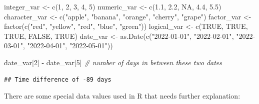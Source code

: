 \documentclass[
  12pt,
  oneside]{book}
\newenvironment{Shaded}{\begin{snugshade}}{\end{snugshade}}
\newcommand{\CommentTok}[1]{\textcolor[rgb]{0.56,0.35,0.01}{\textit{#1}}}
\newcommand{\ConstantTok}[1]{\textcolor[rgb]{0.00,0.00,0.00}{#1}}
\newcommand{\DecValTok}[1]{\textcolor[rgb]{0.00,0.00,0.81}{#1}}
\newcommand{\FloatTok}[1]{\textcolor[rgb]{0.00,0.00,0.81}{#1}}
\newcommand{\FunctionTok}[1]{\textcolor[rgb]{0.00,0.00,0.00}{#1}}
\newcommand{\NormalTok}[1]{#1}
\newcommand{\OtherTok}[1]{\textcolor[rgb]{0.56,0.35,0.01}{#1}}
\newcommand{\SpecialCharTok}[1]{\textcolor[rgb]{0.00,0.00,0.00}{#1}}
\newcommand{\StringTok}[1]{\textcolor[rgb]{0.31,0.60,0.02}{#1}}
\theoremstyle{definition}
\theoremstyle{definition}
\theoremstyle{definition}
\theoremstyle{definition}
\theoremstyle{remark}
\begin{document}
\begin{Shaded}
\begin{Highlighting}[]
\NormalTok{integer\_var }\OtherTok{\textless{}{-}} \FunctionTok{c}\NormalTok{(}\DecValTok{1}\NormalTok{, }\DecValTok{2}\NormalTok{, }\DecValTok{3}\NormalTok{, }\DecValTok{4}\NormalTok{, }\DecValTok{5}\NormalTok{)}
\NormalTok{numeric\_var }\OtherTok{\textless{}{-}} \FunctionTok{c}\NormalTok{(}\FloatTok{1.1}\NormalTok{, }\FloatTok{2.2}\NormalTok{, }\ConstantTok{NA}\NormalTok{, }\FloatTok{4.4}\NormalTok{, }\FloatTok{5.5}\NormalTok{)}
\NormalTok{character\_var }\OtherTok{\textless{}{-}} \FunctionTok{c}\NormalTok{(}\StringTok{"apple"}\NormalTok{, }\StringTok{"banana"}\NormalTok{, }\StringTok{"orange"}\NormalTok{, }\StringTok{"cherry"}\NormalTok{, }\StringTok{"grape"}\NormalTok{)}
\NormalTok{factor\_var }\OtherTok{\textless{}{-}} \FunctionTok{factor}\NormalTok{(}\FunctionTok{c}\NormalTok{(}\StringTok{"red"}\NormalTok{, }\StringTok{"yellow"}\NormalTok{, }\StringTok{"red"}\NormalTok{, }\StringTok{"blue"}\NormalTok{, }\StringTok{"green"}\NormalTok{))}
\NormalTok{logical\_var }\OtherTok{\textless{}{-}} \FunctionTok{c}\NormalTok{(}\ConstantTok{TRUE}\NormalTok{, }\ConstantTok{TRUE}\NormalTok{, }\ConstantTok{TRUE}\NormalTok{, }\ConstantTok{FALSE}\NormalTok{, }\ConstantTok{TRUE}\NormalTok{)}
\NormalTok{date\_var }\OtherTok{\textless{}{-}} \FunctionTok{as.Date}\NormalTok{(}\FunctionTok{c}\NormalTok{(}\StringTok{"2022{-}01{-}01"}\NormalTok{, }\StringTok{"2022{-}02{-}01"}\NormalTok{, }\StringTok{"2022{-}03{-}01"}\NormalTok{, }\StringTok{"2022{-}04{-}01"}\NormalTok{, }\StringTok{"2022{-}05{-}01"}\NormalTok{))}

\NormalTok{date\_var[}\DecValTok{2}\NormalTok{] }\SpecialCharTok{{-}}\NormalTok{ date\_var[}\DecValTok{5}\NormalTok{] }\CommentTok{\# number of days in between these two dates}
\end{Highlighting}
\end{Shaded}

\begin{verbatim}
## Time difference of -89 days
\end{verbatim}

There are some special data values used in R that needs further explanation:
\end{document}
